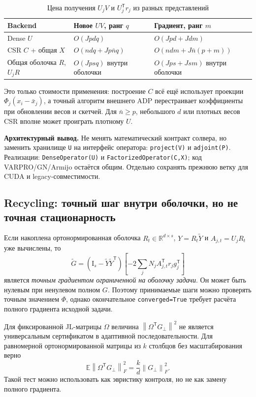 \documentclass[10.5pt,a4paper]{article}
\newcommand{\R}{\mathbb{R}}
\newcommand{\I}{\mathrm{I}}
\newcommand{\T}{^{\mathsf T}}
\newcommand{\norm}[1]{\left\|#1\right\|}
\numberwithin{equation}{section}
\theoremstyle{plain}
\theoremstyle{definition}
\begin{document}
\begin{table}[ht]
\centering\small
\caption{Цена получения $U_jV$ и $U_j\T r_j$ из разных представлений}
\begin{tabularx}{\linewidth}{@{}P{27mm}L L@{}}\toprule
Backend & Новое $UV$, ранг $q$ & Градиент, ранг $m$\\\midrule
Dense $U$ & $O(Jpdq)$ & $O(Jpd+Jdm)$\\
CSR $C$ + общая $X$ & $O(ndq+Jp\bar n q)$ & $O(ndm+J\bar n(p+m))$\\
Общая оболочка $R$, $U_jR$ & $O(Jpsq)$ внутри оболочки & $O(Jps+Jsm)$ внутри оболочки\\
\bottomrule\end{tabularx}
\label{tab:backend}
\end{table}
Это только стоимости применения: построение $C$ всё ещё использует проекции $\Phi_j(x_i-\bar x_j)$, а точный алгоритм внешнего ADP перестраивает коэффициенты при обновлении весов и скетчей. Для $\bar n\ge p$, небольшого $d$ или плотных весов CSR вполне может проиграть плотному $U$.

\begin{mainbox}
\textbf{Архитектурный вывод.} Не менять математический контракт солвера, но заменить хранилище \texttt{U} на интерфейс оператора: \texttt{project(V)} и \texttt{adjoint(P)}. Реализации: \texttt{DenseOperator(U)} и \texttt{FactorizedOperator(C,X)}; код VARPRO/GN/Armijo остаётся общим. Отдельно сохранять прежнюю ветку для CUDA и legacy-совместимости.
\end{mainbox}

\subsection{Recycling: точный шаг внутри оболочки, но не точная стационарность}
Если накоплена ортонормированная оболочка $R_t\in\R^{d\times s}$, $Y=R_t\widetilde Y$ и $A_{j,t}=U_jR_t$ уже вычислены, то
\begin{equation}
 \widetilde G=(\I_s-\widetilde Y\widetilde Y\T)
 \left[-2\sum_jN_j A_{j,t}\T r_jg_j\T\right]
 \label{eq:recycle}
\end{equation}
является \emph{точным градиентом ограниченной на оболочку задачи}. Он может быть нулевым при ненулевом полном $G$. Поэтому принимаемые шаги можно проверять точным значением $\Phi$, однако окончательное \texttt{converged=True} требует расчёта полного градиента исходной задачи.

Для фиксированной JL-матрицы $\Omega$ величина $\norm{\Omega\T G_\perp}^2$ не является универсальным сертификатом в адаптивной последовательности. Для равномерной ортонормированной матрицы из $k$ столбцов без масштабирования верно
\begin{equation*}\mathbb E\norm{\Omega\T G_\perp}_F^2=\frac{k}{d}\norm{G_\perp}_F^2.\end{equation*}
Такой тест можно использовать как эвристику контроля, но не как замену полного градиента.
\end{document}
